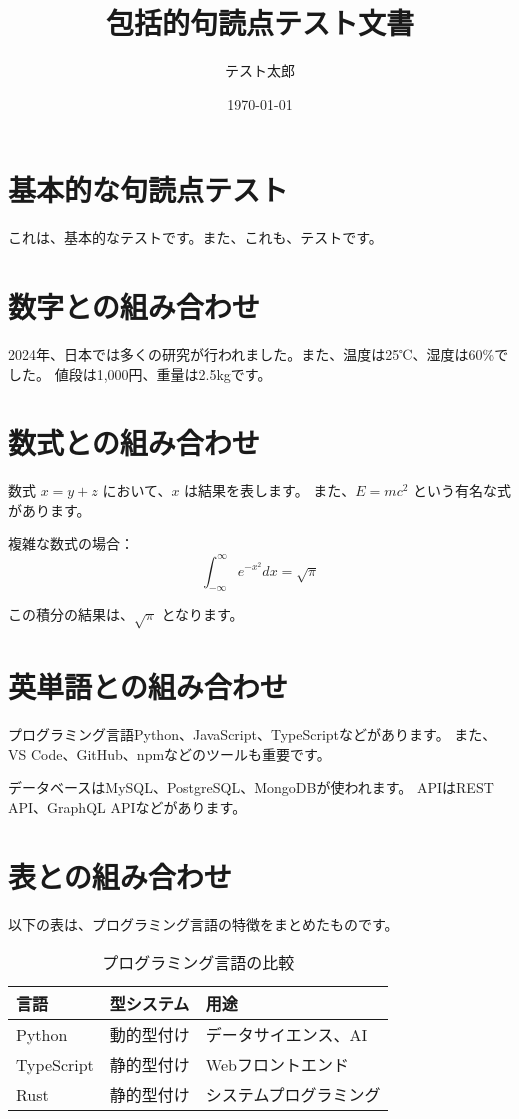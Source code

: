 \documentclass{article}
\title{包括的句読点テスト文書}
\author{テスト太郎}
\date{\today}
\begin{document}
\maketitle

\section{基本的な句読点テスト}

これは、基本的なテストです。また、これも、テストです。

\section{数字との組み合わせ}

2024年、日本では多くの研究が行われました。また、温度は25℃、湿度は60\%でした。
値段は1,000円、重量は2.5kgです。

\section{数式との組み合わせ}

数式 $x = y + z$ において、$x$ は結果を表します。
また、$E = mc^2$ という有名な式があります。

複雑な数式の場合：
\begin{equation}
\int_{-\infty}^{\infty} e^{-x^2} dx = \sqrt{\pi}
\end{equation}

この積分の結果は、$\sqrt{\pi}$ となります。

\section{英単語との組み合わせ}

プログラミング言語Python、JavaScript、TypeScriptなどがあります。
また、VS Code、GitHub、npmなどのツールも重要です。

データベースはMySQL、PostgreSQL、MongoDBが使われます。
APIはREST API、GraphQL APIなどがあります。

\section{表との組み合わせ}

以下の表は、プログラミング言語の特徴をまとめたものです。

\begin{table}[h]
\centering
\begin{tabular}{|l|l|l|}
\hline
言語 & 型システム & 用途 \\
\hline
Python & 動的型付け & データサイエンス、AI \\
TypeScript & 静的型付け & Webフロントエンド \\
Rust & 静的型付け & システムプログラミング \\
\hline
\end{tabular}
\caption{プログラミング言語の比較}
\end{table}
\end{document}
